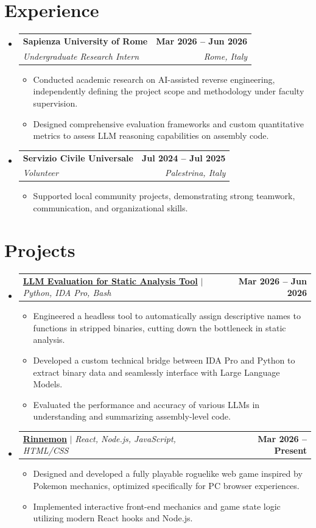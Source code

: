 \documentclass[letterpaper,11pt]{article}
\makeatletter
\newcommand{\resumeItem}[1]{
  \item\small{
    {#1 \vspace{-2pt}}
  }
}
\newcommand{\resumeSubheading}[4]{
  \vspace{-2pt}\item
    \begin{tabular*}{1.0\textwidth}[t]{l@{\extracolsep{\fill}}r}
      \textbf{#1} & \textbf{\small #2} \\
      \textit{\small#3} & \textit{\small #4} \\
    \end{tabular*}\vspace{-7pt}
}
\newcommand{\resumeProjectHeading}[2]{
    \item
    \begin{tabular*}{1.001\textwidth}{l@{\extracolsep{\fill}}r}
      \small#1 & \textbf{\small #2}\\
    \end{tabular*}\vspace{-7pt}
}
\newcommand{\resumeSubHeadingListStart}{\begin{itemize}[leftmargin=0.0in, label={}]}
\newcommand{\resumeSubHeadingListEnd}{\end{itemize}}
\newcommand{\resumeItemListStart}{\begin{itemize}}
\newcommand{\resumeItemListEnd}{\end{itemize}\vspace{-5pt}}
\makeatother
\begin{document}
\section{Experience}
  \resumeSubHeadingListStart

    \resumeSubheading
      {Sapienza University of Rome}{Mar 2026 -- Jun 2026}
      {Undergraduate Research Intern}{Rome, Italy}
      \resumeItemListStart
        \resumeItem{Conducted academic research on AI-assisted reverse engineering, independently defining the project scope and methodology under faculty supervision.}
        \resumeItem{Designed comprehensive evaluation frameworks and custom quantitative metrics to assess LLM reasoning capabilities on assembly code.}
      \resumeItemListEnd

    \resumeSubheading
      {Servizio Civile Universale}{Jul 2024 -- Jul 2025}
      {Volunteer}{Palestrina, Italy}
      \resumeItemListStart
        \resumeItem{Supported local community projects, demonstrating strong teamwork, communication, and organizational skills.}
      \resumeItemListEnd
    
  \resumeSubHeadingListEnd
\vspace{-16pt}

\section{Projects}
    \vspace{-5pt}
    \resumeSubHeadingListStart
      \resumeProjectHeading
          {\textbf{\href{https://github.com/lucaccc1/valutazione-llm-per-analisi-statica-binari}{LLM Evaluation for Static Analysis Tool}} $|$ \emph{Python, IDA Pro, Bash}}{Mar 2026 -- Jun 2026}
          \resumeItemListStart
            \resumeItem{Engineered a headless tool to automatically assign descriptive names to functions in stripped binaries, cutting down the bottleneck in static analysis.}
            \resumeItem{Developed a custom technical bridge between IDA Pro and Python to extract binary data and seamlessly interface with Large Language Models.}
            \resumeItem{Evaluated the performance and accuracy of various LLMs in understanding and summarizing assembly-level code.}
          \resumeItemListEnd
          \vspace{-13pt}
      \resumeProjectHeading
          {\textbf{\href{https://github.com/lucaccc1/rinnemon}{Rinnemon}} $|$ \emph{React, Node.js, JavaScript, HTML/CSS}}{Mar 2026 -- Present}
          \resumeItemListStart
            \resumeItem{Designed and developed a fully playable roguelike web game inspired by Pokemon mechanics, optimized specifically for PC browser experiences.}
            \resumeItem{Implemented interactive front-end mechanics and game state logic utilizing modern React hooks and Node.js.}
          \resumeItemListEnd 
    \resumeSubHeadingListEnd
\vspace{-15pt}
\end{document}
